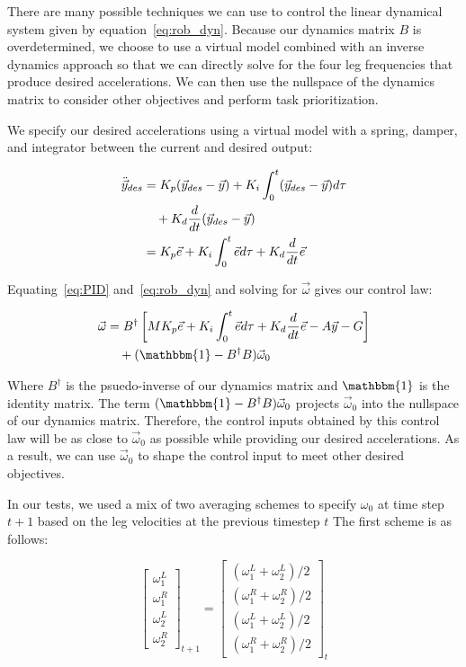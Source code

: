 There are many possible techniques we can use to control the linear dynamical system given by equation~\ref{eq:rob_dyn}. Because our dynamics matrix $B$ is overdetermined, we choose to use a virtual model combined with an inverse dynamics approach so that we can directly solve for the four leg frequencies that produce desired accelerations. We can then use the nullspace of the dynamics matrix to consider other objectives and perform task prioritization.

We specify our desired accelerations using a virtual model with a spring, damper, and integrator between the current and desired output:

\begin{align}
    \ddot{\vec{y}}_{des} &= K_p (\vec{y}_{des} - \vec{y}) + K_i \int_0^t (\vec{y}_{des} - \vec{y}) d\tau \notag \\
                         &\quad + K_d \frac{d}{dt} (\vec{y}_{des} - \vec{y}) \\
                         &= K_p \vec{e} + K_i \int_0^t \vec{e} d \tau + K_d \frac{d}{dt} \vec{e} \label{eq:PID}
\end{align}

Equating~\ref{eq:PID} and~\ref{eq:rob_dyn} and solving for $\vec{\omega}$ gives our control law:

\begin{align}
    \vec{\omega} &= B^{\dagger} \left[ M K_p \vec{e} + K_i \int_0^t \vec{e} d \tau + K_d \frac{d}{dt} \vec{e} - A \vec{y} - G \right] \notag \\
                 &\quad + (\mathbbm{1} - B^{\dagger} B) \vec{\omega}_0 \label{eq:control}
\end{align}

\noindent Where $B^{\dagger}$ is the psuedo-inverse of our dynamics matrix and $\mathbbm{1}$ is the identity matrix. The term $(\mathbbm{1} - B^{\dagger} B) \vec{\omega}_0$ projects $\vec{\omega}_0$ into the nullspace of our dynamics matrix. Therefore, the control inputs obtained by this control law will be as close to $\vec{\omega}_0$ as possible while providing our desired accelerations. As a result, we can use $\vec{\omega}_0$ to shape the control input to meet other desired objectives.

In our tests, we used a mix of two averaging schemes to specify $\omega_0$ at time step $t+1$ based on the leg velocities at the previous timestep $t$ The first scheme is as follows:

\begin{equation}
    \begin{bmatrix} \omega_1^L \\ \omega_1^R \\ \omega_2^L \\ \omega_2^R \end{bmatrix}_{t+1} = \begin{bmatrix} (\omega_1^L + \omega_2^L)/2 \\(\omega_1^R + \omega_2^R)/2 \\ (\omega_1^L + \omega_2^L)/2 \\ (\omega_1^R + \omega_2^R)/2 \end{bmatrix}_{t}
\end{equation}

